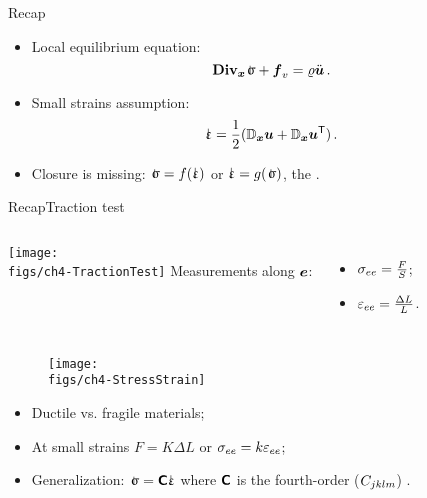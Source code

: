 \begin{frame}{Recap}

\begin{itemize}
\item Local equilibrium equation:
\begin{displaymath}
\Divx\stress+\fv_v=\roi\ddot{\uv}\,.
\end{displaymath}
\item Small strains assumption:
\begin{displaymath}
\strain=\demi(\Gradx\uv+\Gradx\uv^\itr)\,.
\end{displaymath}
\item Closure is missing: $\stress=f(\strain)$ or $\strain=g(\stress)$, the .
\end{itemize}

\end{frame}

\begin{frame}{Recap}{Traction test}

\begin{overprint}

\begin{columns}[t]
\centering\texttt{[image: \\figs/ch4-TractionTest]}
\vskip-120pt
Measurements along ${\boldsymbol{e}}$:
\begin{itemize}
\item $\sigma_{ee}=\frac{F}{S}$;
\item $\varepsilon_{ee}=\frac{\Delta L}{L}$.
\end{itemize}
\end{columns}

\begin{figure}
\centering\texttt{[image: \\figs/ch4-StressStrain]}
\end{figure}
\begin{itemize}
\item Ductile vs. fragile materials;
\item At small strains $F=K\Delta L$ or $\sigma_{ee}=k\varepsilon_{ee}$;
\item Generalization: $\stress=\tenselas\strain$ where $\boldsymbol{\mathsf{{\Large C}}}$ is the fourth-order (${\Large C}_{jklm}$) .
\end{itemize}

\end{overprint}

\end{frame}

